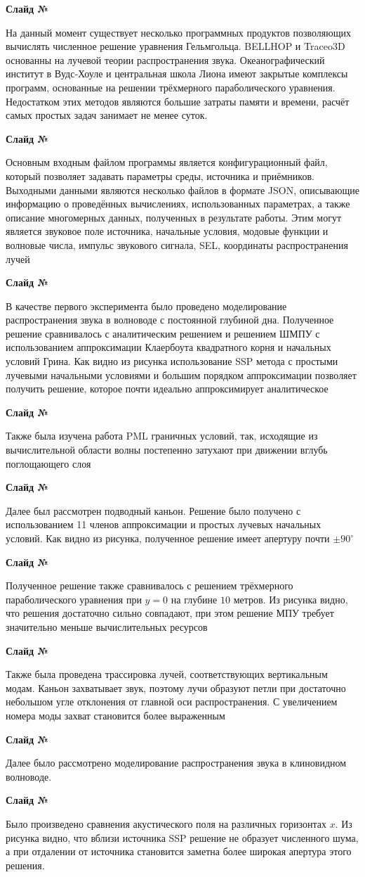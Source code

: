 \documentclass{fefu}
\newcounter{slide}
\newcommand{\slide}{\stepcounter{slide}\par\noindent\textbf{Слайд №\theslide}\par\noindent}
\begin{document}
    \slide
    На данный момент существует несколько программных продуктов позволяющих вычислять численное решение уравнения Гельмгольца. BELLHOP и Traceo3D основанны на лучевой теории распространения звука. Океанографический институт в Вудс-Хоуле и центральная школа Лиона имеют закрытые комплексы программ, основанные на решении трёхмерного параболического уравнения. Недостатком этих методов являются большие затраты памяти и времени, расчёт самых простых задач занимает не менее суток.
    \slide
    Основным входным файлом программы является конфигурационный файл, который позволяет задавать параметры среды, источника и приёмников. Выходными данными являются несколько файлов в формате JSON, описывающие информацию о проведённых вычислениях, использованных параметрах, а также описание многомерных данных, полученных в результате работы. Этим могут является звуковое поле источника, начальные условия, модовые функции и волновые числа, импульс звукового сигнала, SEL, координаты распространения лучей
    \slide
    В качестве первого эксперимента было проведено моделирование распространения звука в волноводе с постоянной глубиной дна. Полученное решение сравнивалось с аналитическим решением и решением ШМПУ с использованием аппроксимации Клаербоута квадратного корня и начальных условий Грина. Как видно из рисунка использование SSP метода с простыми лучевыми начальными условиями и большим порядком аппроксимации позволяет получить решение, которое почти идеально аппроксимирует аналитическое
    \slide
    Также была изучена работа PML граничных условий, так, исходящие из вычислительной области волны постепенно затухают при движении вглубь поглощающего слоя
    \slide
    Далее был рассмотрен подводный каньон. Решение было получено с использованием 11 членов аппроксимации и простых лучевых начальных условий. Как видно из рисунка, полученное решение имеет апертуру почти $\pm 90^\circ$
    \slide
    Полученное решение также сравнивалось с решением трёхмерного параболического уравнения при $y=0$ на глубине $10$ метров. Из рисунка видно, что решения достаточно сильно совпадают, при этом решение МПУ требует значительно меньше вычислительных ресурсов
    \slide
    Также была проведена трассировка лучей, соответствующих вертикальным модам. Каньон захватывает звук, поэтому лучи образуют петли при достаточно небольшом угле отклонения от главной оси распространения. С увеличением номера моды захват становится более выраженным
    \slide
    Далее было рассмотрено моделирование распространения звука в клиновидном волноводе.
    \slide
    Было произведено сравнения акустического поля на различных горизонтах $x$. Из рисунка видно, что вблизи источника SSP решение не образует численного шума, а при отдалении от источника становится заметна более широкая апертура этого решения.
\end{document}
